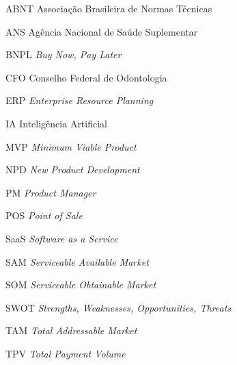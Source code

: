 \listoffigures*
\cleardoublepage
{}
\listoftables*
\cleardoublepage
\begin{siglas}
  \item[ABNT] Associação Brasileira de Normas Técnicas
  \item[ANS] Agência Nacional de Saúde Suplementar
  \item[BNPL] \textit{Buy Now, Pay Later}
  \item[CFO] Conselho Federal de Odontologia
  \item[ERP] \textit{Enterprise Resource Planning}
  \item[IA] Inteligência Artificial
  \item[MVP] \textit{Minimum Viable Product}
  \item[NPD] \textit{New Product Development}
  \item[PM] \textit{Product Manager}
  \item[POS] \textit{Point of Sale}
  \item[SaaS] \textit{Software as a Service}
  \item[SAM] \textit{Serviceable Available Market}
  \item[SOM] \textit{Serviceable Obtainable Market}
  \item[SWOT] \textit{Strengths, Weaknesses, Opportunities, Threats}
  \item[TAM] \textit{Total Addressable Market}
  \item[TPV] \textit{Total Payment Volume}
\end{siglas}
\cleardoublepage

